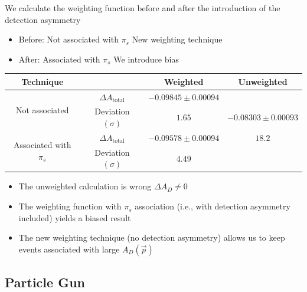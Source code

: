 \documentclass{beamer}
\begin{document}
\begin{frame}
      \frametitle{\insertsubsectionhead}
      \rightarrow We calculate the weighting function before and after the introduction of the detection asymmetry
      \begin{itemize}
            \item Before: Not associated with $\pi_s$ \Rightarrow New weighting technique
            \item After: Associated with $\pi_s$ \Rightarrow We introduce bias
      \end{itemize}
      \begin{center}
            \scriptsize
            \begin{tabular}{c|c|c|c}
                  Technique& & Weighted & Unweighted\\
                  \hline\hline
                  \multirow{2}{*}{Not associated} & $\Delta A_\text{total}$ & $-0.09845 \pm 0.00094$ & \\
                  & Deviation $(\sigma)$ & $1.65$ & $-0.08303 \pm 0.00093$\\
                  \cline{1-3}
                  \multirow{2}{*}{Associated with $\pi_s$} & $\Delta A_\text{total}$ & $-0.09578 \pm 0.00094$ & $18.2$\\
                  & Deviation $(\sigma)$ & $4.49$ & \\
            \end{tabular}
    \end{center}
    \normalsize
    \begin{itemize}
      \item The unweighted calculation is wrong \rightarrow $\Delta A_D \neq 0$
      \item The weighting function with $\pi_s$ association (i.e., with detection asymmetry included) yields a biased result
      \item The new weighting technique (no detection asymmetry) allows us to keep events associated with large $A_D(\vec{p})$ 
    \end{itemize}
\end{frame}

\subsection{Particle Gun}
\end{document}
